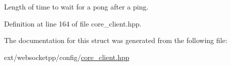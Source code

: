 Length of time to wait for a pong after a ping. 



Definition at line 164 of file core\+\_\+client.\+hpp.



The documentation for this struct was generated from the following file\+:\begin{DoxyCompactItemize}
\item 
ext/websocketpp/config/\hyperlink{core__client_8hpp}{core\+\_\+client.\+hpp}\end{DoxyCompactItemize}
